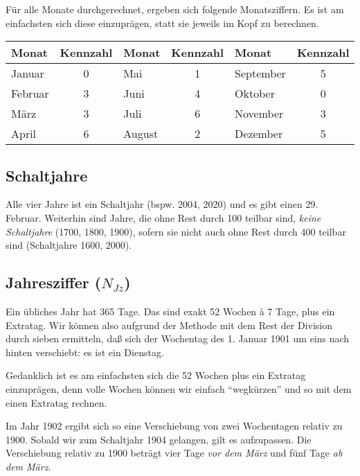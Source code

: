 \documentclass[version=last,paper=A4,fontsize=11pt,DIV=18]{scrartcl}
\begin{document}
Für alle Monate durchgerechnet, ergeben sich folgende Monatsziffern. Es ist am einfachsten sich diese einzuprägen, statt sie jeweils im Kopf zu berechnen.

\begin{center}
    \begin{tabular}{ | l c | l c | l c | }
        \hline
        Monat   & Kennzahl & Monat     & Kennzahl & Monat     & Kennzahl \\
        \hline
        Januar  &        0 & Mai       &        1 & September &        5 \\
        Februar &        3 & Juni      &        4 & Oktober   &        0 \\
        März    &        3 & Juli      &        6 & November  &        3 \\
        April   &        6 & August    &        2 & Dezember  &        5 \\
        \hline
    \end{tabular}
\end{center}

\subsection*{Schaltjahre}

Alle vier Jahre ist ein Schaltjahr (bspw. 2004, 2020) und es gibt einen 29. Februar. Weiterhin sind Jahre, die ohne Rest durch 100 teilbar sind, \emph{keine Schaltjahre} (1700, 1800, 1900), sofern sie nicht auch ohne Rest durch 400 teilbar sind (Schaltjahre 1600, 2000).

\subsection*{Jahresziffer ($N_{Jz}$)}

Ein übliches Jahr hat 365 Tage. Das sind exakt 52 Wochen \`a 7 Tage, plus ein Extratag. Wir können also aufgrund der Methode mit dem Rest der Division durch sieben ermitteln, daß sich der Wochentag des 1. Januar 1901 um eins nach hinten verschiebt: es ist ein Dienstag.

Gedanklich ist es am einfachsten sich die 52 Wochen plus ein Extratag einzuprägen, denn volle Wochen können wir einfach \enquote{wegkürzen} und so mit dem einen Extratag rechnen.

Im Jahr 1902 ergibt sich so eine Verschiebung von zwei Wochentagen relativ zu 1900. Sobald wir zum Schaltjahr 1904 gelangen, gilt es aufzupassen. Die Verschiebung relativ zu 1900 beträgt vier Tage \emph{vor dem März} und fünf Tage \emph{ab dem März}.
\end{document}
